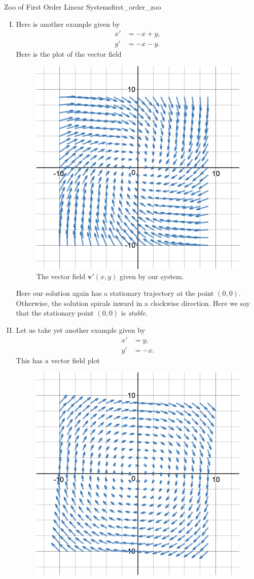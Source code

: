 \begin{ex}{Zoo of First Order Linear Systems}{first_order_zoo}
\begin{enumerate}[(I)]
            \item Here is another example given by
            \begin{align*}
                x' &= -x +y,\\
                y' &= -x -y.
            \end{align*}
            Here is the plot of the vector field
            \begin{figure}[H]
                \centering
                \includegraphics[width=.6\textwidth]{Figures_Part_7/-x+y-x-y.png}
                \caption{The vector field $\mathbf{v}'(x,y)$ given by our system.}
            \end{figure}
            Here our solution again has a stationary trajectory at the point $(0,0)$.  Otherwise, the solution spirals inward in a clockwise direction.  Here we say that the stationary point $(0,0)$ is \emph{stable}.
            \item Let us take yet another example given by
            \begin{align*}
                x' &= y,\\
                y' &= -x.
            \end{align*}
            This has a vector field plot
            \begin{figure}[H]
                \centering
                \includegraphics[width=.6\textwidth]{Figures_Part_7/y-x.png}

\end{figure}
\end{enumerate}
\end{ex}
